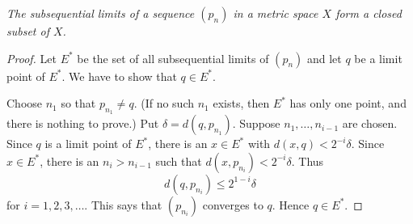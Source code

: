 \emph{The subsequential limits of a sequence $(p_n)$ in a metric space $X$ form
a closed subset of $X$.}

\begin{proof}
Let $E^*$ be the set of all subsequential limits of $(p_n)$ and let $q$ be a
limit point of $E^*$. We have to show that $q \in E^*$.

Choose $n_1$ so that $p_{n_1} \ne q$. (If no such $n_1$ exists, then $E^*$ has
only one point, and there is nothing to prove.) Put $\delta = d(q,p_{n_1})$.
Suppose $n_1,\dots,n_{i-1}$ are chosen. Since $q$ is a limit point of $E^*$,
there is an $x \in E^*$ with $d(x,q) < 2^{-i}\delta$. Since $x \in E^*$, there
is an $n_i > n_{i-1}$ such that $d(x,p_{n_i}) < 2^{-i}\delta$. Thus
\[ d(q,p_{n_i}) \le 2^{1-i}\delta \]
for $i = 1,2,3,\dots$. This says that $(p_{n_i})$ converges to $q$. Hence
$q \in E^*$.
\end{proof}
